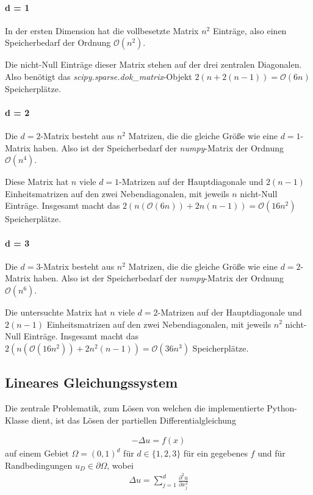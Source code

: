 \documentclass[smallheadings]{scrartcl}
\begin{document}
\paragraph{d = 1}
In der ersten Dimension hat die vollbesetzte Matrix $n^2$ Einträge, also einen Speicherbedarf der Ordnung $\mathcal{O}(n^2)$.

Die nicht-Null Einträge dieser Matrix stehen auf der drei zentralen Diagonalen. Also benötigt das \textit{scipy.sparse.dok\_matrix}-Objekt $2(n+2(n-1)) = \mathcal{O}(6n)$ Speicherplätze.

\paragraph{d = 2}
Die $d=2$-Matrix besteht aus $n^2$ Matrizen, die die gleiche Größe wie eine $d=1$-Matrix haben. Also ist der Speicherbedarf der \textit{numpy}-Matrix der Ordnung $\mathcal{O}(n^4)$.

 Diese Matrix hat $n$ viele $d=1$-Matrizen auf der Hauptdiagonale  und $2(n-1)$ Einheitsmatrizen auf den zwei Nebendiagonalen, mit jeweils $n$ nicht-Null Einträge. Insgesamt macht das $2(n(\mathcal{O}(6n))+2n(n-1))=\mathcal{O}(16n^2)$ Speicherplätze.
 
 \paragraph{d = 3}
 Die $d=3$-Matrix besteht aus $n^2$ Matrizen, die die gleiche Größe wie eine $d=2$-Matrix haben. Also ist der Speicherbedarf der \textit{numpy}-Matrix der Ordnung $\mathcal{O}(n^6)$.
 
 Die untersuchte Matrix hat $n$ viele $d=2$-Matrizen auf der Hauptdiagonale  und $2(n-1)$ Einheitsmatrizen auf den zwei Nebendiagonalen, mit jeweils $n^2$ nicht-Null Einträge. Insgesamt macht das $2(n(\mathcal{O}(16n^2))+2n^2(n-1))=\mathcal{O}(36n^3)$ Speicherplätze.


\subsection{Lineares Gleichungssystem}

Die zentrale Problematik, zum Lösen von welchen die implementierte Python-Klasse dient, ist das Lösen der partiellen Differentialgleichung

\begin{align}
-\Delta u=f(x)
\end{align}
auf einem Gebiet $\Omega=(0, 1)^d$ für $d\in \{1, 2, 3\}$ für ein gegebenes $f$ und für Randbedingungen $u_D \in \partial\Omega$, wobei 
\begin{align}
\Delta u=\sum_{j=1}^{d}\frac{\partial^2 u}{\partial x_j^2}
\end{align}
\end{document}
